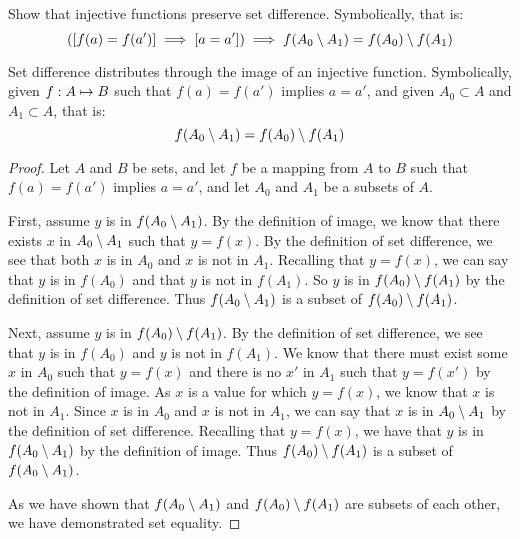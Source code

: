 \documentclass[main.tex]{subfiles}
\begin{document}
\subproblem{}\label{s2p2h}

Show that injective functions preserve set difference. Symbolically, that is:
\[([f(a) = f(a')] \implies [a = a']) \implies f(A_0 \setminus A_1) = f(A_0) \setminus f(A_1)\]

\begin{thm}
	Set difference distributes through the image of an injective function.
	Symbolically, given \({f}: {A} \mapsto{} {B}\) such that
	\(f(a) = f(a')\) implies \(a = a'\), and given \(A_0 \subset A\) and
	\(A_1 \subset A\), that is:
	\[f(A_0 \setminus A_1) = f(A_0) \setminus f(A_1)\]
\end{thm}
\begin{proof}
	Let \(A\) and \(B\) be sets, and let \(f\) be a mapping from \(A\) to
	\(B\) such that \(f(a) = f(a')\) implies \(a = a'\), and let \(A_0\) and
	\(A_1\) be a subsets of \(A\).

	First, assume \(y\) is in \(f(A_0 \setminus A_1)\). By the definition of
	image, we know that there exists \(x\) in \(A_0 \setminus A_1\) such that
	\(y = f(x)\). By the definition of set difference, we see that both
	\(x\) is in \(A_0\) and \(x\) is not in \(A_1\). Recalling that
	\(y = f(x)\), we can say that \(y\) is in \(f(A_0)\) and that \(y\) is
	not in \(f(A_1)\). So \(y\) is in \(f(A_0) \setminus f(A_1)\) by the
	definition of set difference. Thus \(f(A_0 \setminus A_1)\) is a subset
	of \(f(A_0) \setminus f(A_1)\).

	Next, assume \(y\) is in \(f(A_0) \setminus f(A_1)\). By the definition
	of set difference, we see that \(y\) is in \(f(A_0)\) and \(y\) is not
	in \(f(A_1)\). We know that there must exist some \(x\) in \(A_0\) such
	that \(y = f(x)\) and there is no \(x'\) in \(A_1\) such that
	\(y = f(x')\) by the definition of image. As \(x\) is a value for which
	\(y = f(x)\), we know that \(x\) is not in \(A_1\). Since \(x\) is in
	\(A_0\) and \(x\) is not in \(A_1\), we can say that \(x\) is in
	\(A_0 \setminus A_1\) by the definition of set difference. Recalling that
	\(y = f(x)\), we have that \(y\) is in \(f(A_0 \setminus A_1)\) by the
	definition of image. Thus \(f(A_0) \setminus f(A_1)\) is a subset of
	\(f(A_0 \setminus A_1)\).

	As we have shown that \(f(A_0 \setminus A_1)\) and
	\(f(A_0) \setminus f(A_1)\) are subsets of each other, we have
	demonstrated set equality.
\end{proof}
\end{document}
